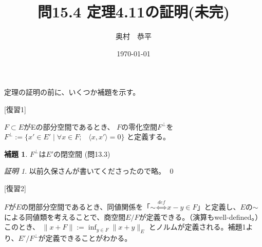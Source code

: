 \documentclass[11pt,a4paper]{amsart}
\theoremstyle{definition}
\newtheorem{lem}{補題}
\theoremstyle{definition}
\theoremstyle{remark}
\newtheorem{prf}{証明}
\begin{document}
\title{問15.4 定理4.11の証明(未完)}
\author{奥村　恭平}
\date{\today}
\maketitle

定理の証明の前に、いくつか補題を示す。

[復習1]

$F \subset E$がEの部分空間であるとき、 $F$の零化空間$F^\bot$を
$F^\bot := \{x' \in E' \; | \; \forall x \in F; \;\;\;\langle x,x' \rangle = 0 \}$
と定義する。


\begin{lem} 
$F^\bot$は$E'$の閉空間  (問13.3)
\end{lem}
\begin{prf}
以前久保さんが書いてくださったので略。
\qed
\end{prf}

[復習2]

$F$が$E$の閉部分空間であるとき、同値関係を「$\sim \overset{def}{\Longleftrightarrow} x-y \in F$」と定義し、$E$の$\sim$による同値類を考えることで、商空間$E/F$が定義できる。（演算もwell-defined。）このとき、
$\|x+F\|:= \inf_{y \in F}\|x+y\|_E$
とノルムが定義される。補題1より、$E'/F^\bot$が定義できることがわかる。
\end{document}
